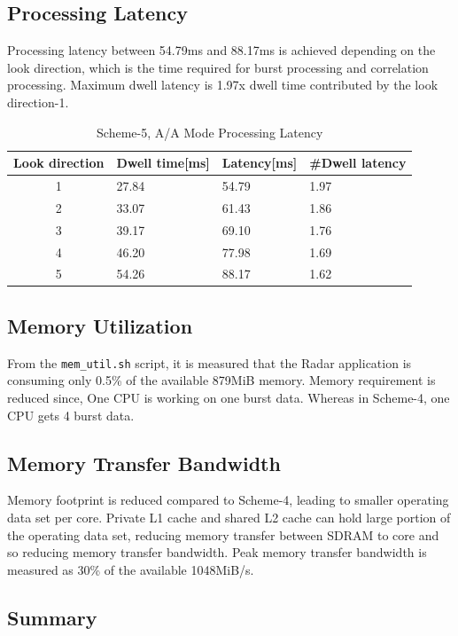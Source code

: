 \subsection{Processing Latency}
\label{ss:mm:scheme5:latency}
Processing latency between 54.79ms and 88.17ms is achieved depending on the look direction, which is the time required for burst processing and correlation processing. Maximum dwell latency is 1.97x dwell time contributed by the look direction-1.

\begin{table}[h!]
	\centering
	\begin{tabular}{|c|l|l|l|} 
	 \hline
	 \textbf{Look direction} & \textbf{Dwell time[ms]} & \textbf{Latency[ms]} & \textbf{\#Dwell latency} \\
	 \hline
	 1 & 27.84 & 54.79 & 1.97 \\ \hline
	 2 & 33.07 & 61.43 & 1.86 \\ \hline
	 3 & 39.17 & 69.10 & 1.76 \\ \hline
	 4 & 46.20 & 77.98 & 1.69 \\ \hline
	 5 & 54.26 & 88.17 & 1.62 \\ \hline
	\end{tabular}
	\caption{Scheme-5, A/A Mode Processing Latency}
	\label{tbl:mm:scheme5_latency}
\end{table}

\subsection{Memory Utilization}
\label{ss:mm:scheme5:mem_util}
From the \verb|mem_util.sh| script, it is measured that the Radar application is consuming only 0.5\% of the available 879MiB memory. Memory requirement is reduced since, One CPU is working on one burst data. Whereas in Scheme-4, one CPU gets 4 burst data. 

\subsection{Memory Transfer Bandwidth}
\label{ss:mm:scheme5:bw_util}
Memory footprint is reduced compared to Scheme-4, leading to smaller operating data set per core. Private L1 cache and shared L2 cache can hold large portion of the operating data set, reducing memory transfer between SDRAM to core and so reducing memory transfer bandwidth. Peak memory transfer bandwidth is measured as 30\% of the available 1048MiB/s.

\subsection{Summary}
\label{ss:mm:scheme5:summary}

